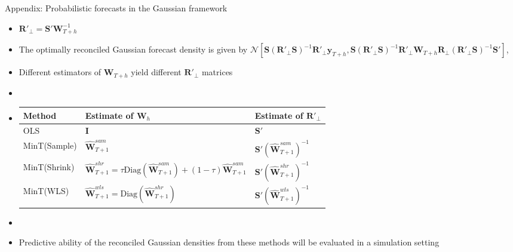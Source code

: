 \documentclass[11pt,xcolor=dvipsnames,table]{beamer} %
\begin{document}
\begin{frame}[noframenumbering]{Appendix: Probabilistic forecasts in the Gaussian framework}
\begin{itemize}[<+-| alert@+>]
\item[] \color{Purple}$\bm{R}'_\bot = \bm{S}'\bm{W}_{T+h}^{-1}$
\item The optimally reconciled Gaussian forecast density is given by
\color{Maroon}$\mathcal{N}[\bm{S}(\bm{R}'_\bot \bm{S})^{-1}\bm{R}'_\bot\hat{\bm{y}}_{T+h}, \bm{S}(\bm{R}'_\bot \bm{S})^{-1}\bm{R}'_\bot{\bm{W}}_{T+h}\bm{R}_\bot(\bm{R}'_\bot \bm{S})^{-1}\bm{S'}]$, 

\item Different estimators of ${\bm{W}}_{T+h}$ yield different $\bm{R}'_\bot$ matrices 
\item[]
\item[]
\begin{center}
\begin{block}{}
\begin{table}
\small
\centering %
\begin{tabular}{lll}
	\toprule
	\textbf{Method} & \textbf{Estimate of $\bm{W}_{h}$} & \textbf{Estimate of $\bm{R}'_\bot$}      \\
	\midrule
	OLS             &
	$\bm{I}$  &
	$\bm{S}'$  \\
	MinT(Sample)    &
	$\bm{\hat{W}}_{T+1}^{sam}$ &
	$\bm{S}'(\bm{\hat{W}}_{T+1}^{sam})^{-1}$ \\
	MinT(Shrink)    &
	$\bm{\hat{W}}_{T+1}^{shr} = \tau\text{Diag}(\bm{\hat{W}}_{T+1}^{sam}) + (1-\tau)\bm{\hat{W}}_{T+1}^{sam}$\hyperlink{Shrinkage} {\beamerbutton{A2}} &
	$\bm{S}'(\bm{\hat{W}}_{T+1}^{shr})^{-1}$ \\
	MinT(WLS)       &
	$\bm{\hat{W}}_{T+1}^{wls} = \text{Diag}(\bm{\hat{W}}_{T+1}^{shr})$ &
	$\bm{S}'(\bm{\hat{W}}_{T+1}^{wls})^{-1}$ \\
	\bottomrule
\end{tabular}
\end{table}
\end{block}
\end{center}
\item[]
\item Predictive ability of the reconciled Gaussian densities from these methods will be evaluated in a simulation setting

\end{itemize}    
\end{frame}
\end{document}

